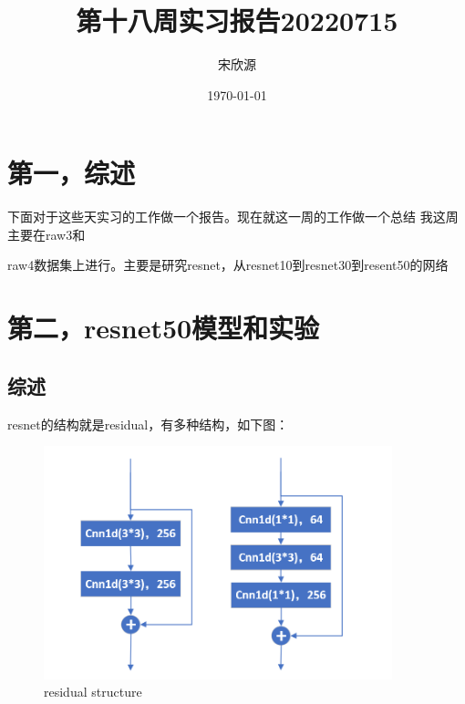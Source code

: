 \documentclass[11pt]{ctexart}
\begin{document}
\title{第十八周实习报告20220715}
\author{宋欣源}
\date{\today}

\maketitle %


\section{第一，综述}

下面对于这些天实习的工作做一个报告。现在就这一周的工作做一个总结
我这周主要在raw3和 \par raw4数据集上进行。主要是研究resnet，从resnet10到resnet30到resent50的网络

\section{第二，resnet50模型和实验}
\subsection{综述}
resnet的结构就是residual，有多种结构，如下图：
\begin{figure}[H]

\begin{center}
\includegraphics[width=0.9\textwidth]{residual1.PNG}
\end{center}
\caption{residual structure}
\label{FIG.1}
\end{figure}
\end{document}
